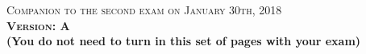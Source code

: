 \documentclass{docist}
\begin{document}
\thispagestyle{empty}

\begin{center}
  {\Large \textsc{Companion to the second exam on January 30th, 2018\\[2ex]
  \textbf{Version: A}\\[2ex]}}
  {\normalsize  \textbf{(You do not need to turn in this set of pages with your exam)}}
\end{center}






\qAvailabilityTwo



\qPerformanceTwo



\qModifiabilityExamTwo



\qDVDCatalogMobile



\qComponentAndConnectorViewtypeTwo



\qModuleViewtypeExamTwo



\qPipesFilters



\qScalableArchitectureOne



\qGraphiteTwo



\qWorkAssigment



\qWebAppsTwo



\qDVDTwo



\qDataModel


\qSOA



\qAdventureBuilderTwo



\qPulseTwo



\qOrderPadTwo



\qFenixTwo



\qAggregateTwo



\qMicroservicesExamTwo
\end{document}
